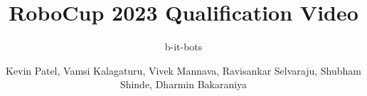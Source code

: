 \documentclass[aspectratio=169]{beamer}
\author[Name]{Kevin Patel, Vamsi Kalagaturu, Vivek Mannava, Ravisankar Selvaraju, Shubham Shinde, Dharmin Bakaraniya}
\title{RoboCup 2023 Qualification Video}
\subtitle{b-it-bots}
\institute[HBRS]{Hochschule Bonn-Rhein-Sieg}
\date{}
\begin{document}
{
\begin{frame}
\titlepage
\end{frame}
}
\end{document}
